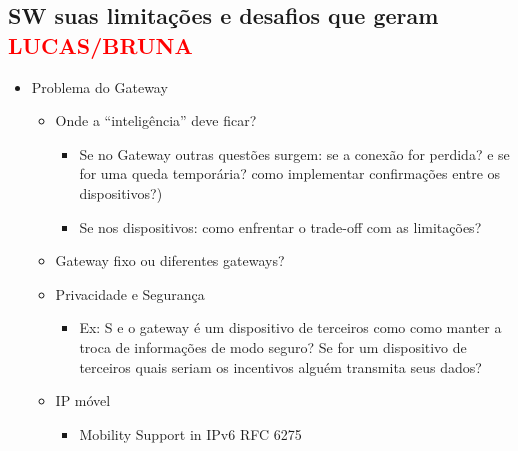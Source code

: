     \subsection{SW suas limitações e desafios que geram 
\textcolor{red}{LUCAS/BRUNA}}
      \begin{itemize}
	\item Problema do Gateway
	  \begin{itemize}
	    
	    \item Onde a ``inteligência'' deve ficar?
	      \begin{itemize}
		\item Se no Gateway outras questões surgem: se a conexão 
for perdida? e se for uma queda temporária? como implementar confirmações entre 
os dispositivos?)
		\item Se nos dispositivos: como enfrentar o trade-off com 
as limitações?
	      \end{itemize}
	    
	    \item Gateway fixo ou diferentes gateways? 
	    
	    \item Privacidade e Segurança
	      \begin{itemize}
		\item Ex: S e o gateway é um dispositivo de terceiros como
como manter a troca de informações de modo seguro? Se for um dispositivo de 
terceiros quais seriam os incentivos alguém transmita seus dados?
	      \end{itemize}
	      
	    \item IP móvel
	      \begin{itemize}
		\item Mobility Support in IPv6 RFC 6275
	      \end{itemize}
	  \end{itemize}
      \end{itemize}

